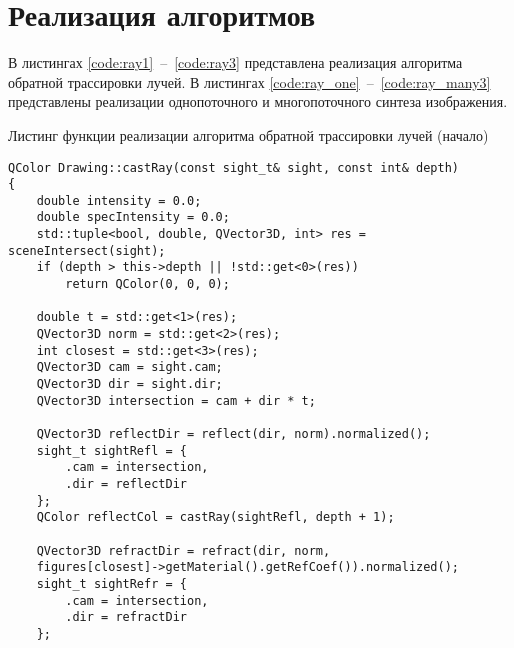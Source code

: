 \section{Реализация алгоритмов}
В листингах \ref{code:ray1}~--~\ref{code:ray3} представлена реализация алгоритма обратной трассировки лучей. В листингах \ref{code:ray_one}~--~\ref{code:ray_many3} представлены реализации однопоточного и многопоточного синтеза изображения.

\begin{code}
\caption{Листинг функции реализации алгоритма обратной трассировки лучей (начало)}
\label{code:ray1}
\begin{verbatim}
QColor Drawing::castRay(const sight_t& sight, const int& depth)
{
    double intensity = 0.0;
    double specIntensity = 0.0;
    std::tuple<bool, double, QVector3D, int> res = sceneIntersect(sight);
    if (depth > this->depth || !std::get<0>(res))
        return QColor(0, 0, 0);

    double t = std::get<1>(res);
    QVector3D norm = std::get<2>(res);
    int closest = std::get<3>(res);
    QVector3D cam = sight.cam;
    QVector3D dir = sight.dir;
    QVector3D intersection = cam + dir * t;

    QVector3D reflectDir = reflect(dir, norm).normalized();
    sight_t sightRefl = {
        .cam = intersection,
        .dir = reflectDir
    };
    QColor reflectCol = castRay(sightRefl, depth + 1);
    
    QVector3D refractDir = refract(dir, norm, 
    figures[closest]->getMaterial().getRefCoef()).normalized();
    sight_t sightRefr = {
        .cam = intersection,
        .dir = refractDir
    };
\end{verbatim}
\end{code}

